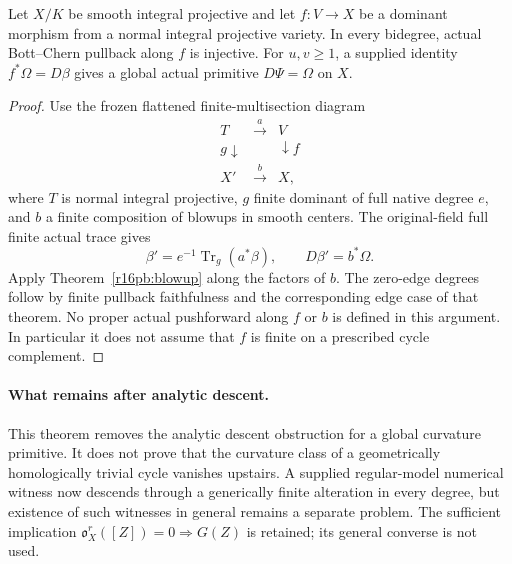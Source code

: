 \begin{corollary}
\label{r16pb:dominant}
Let $X/K$ be smooth integral projective and let $f:V\to X$ be a
dominant morphism from a normal integral projective variety. In every
bidegree, actual Bott--Chern pullback along $f$ is injective.
For $u,v\geq1$, a supplied identity $f^*\Omega=D\beta$ gives a
global actual primitive $D\Psi=\Omega$ on $X$.
\end{corollary}

\begin{proof}
Use the frozen flattened finite-multisection diagram
\[
 \begin{array}{ccc}
 T&\xrightarrow{a}&V\\
 g\downarrow&&\downarrow f\\
 X'&\xrightarrow{b}&X,
 \end{array}
\]
where $T$ is normal integral projective, $g$ finite dominant of full
native degree $e$, and $b$ a finite composition of blowups in smooth
centers. The original-field full finite actual trace gives
\[
                \beta'=e^{-1}\operatorname{Tr}_g(a^*\beta),
                     \qquad D\beta'=b^*\Omega.
\]
Apply Theorem~\ref{r16pb:blowup} along the factors of $b$.
The zero-edge degrees follow by finite pullback faithfulness and the
corresponding edge case of that theorem. No proper actual pushforward
along $f$ or $b$ is defined in this argument. In particular it does not
assume that $f$ is finite on a prescribed cycle complement.
\end{proof}

\paragraph{What remains after analytic descent.}
This theorem removes the analytic descent obstruction for a global
curvature primitive. It does not prove that the curvature class of a
geometrically homologically trivial cycle vanishes upstairs. A supplied
regular-model numerical witness now descends through a generically
finite alteration in every degree, but existence of such witnesses in
general remains a separate problem. The sufficient implication
$\mathfrak o_X^r([Z])=0\Rightarrow G(Z)$ is retained; its general
converse is not used.
